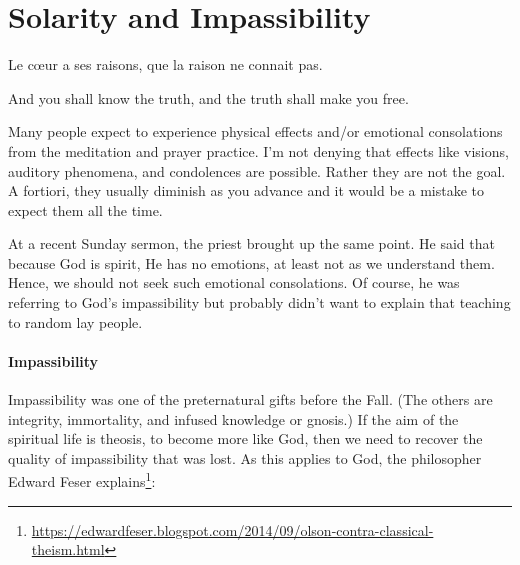 \section{Solarity and Impassibility}

\begin{quotex}
Le cœur a ses raisons, que la raison ne connait pas. 

And you shall know the truth, and the truth shall make you free. 

\end{quotex}
Many people expect to experience physical effects and/or emotional consolations from the meditation and prayer practice. I'm not denying that effects like visions, auditory phenomena, and condolences are possible. Rather they are not the goal. A fortiori, they usually diminish as you advance and it would be a mistake to expect them all the time.

At a recent Sunday sermon, the priest brought up the same point. He said that because God is spirit, He has no emotions, at least not as we understand them. Hence, we should not seek such emotional consolations. Of course, he was referring to God's impassibility but probably didn't want to explain that teaching to random lay people.

\paragraph{Impassibility}
Impassibility was one of the preternatural gifts before the Fall. (The others are integrity, immortality, and infused knowledge or gnosis.) If the aim of the spiritual life is theosis, to become more like God, then we need to recover the quality of impassibility that was lost. As this applies to God, the philosopher Edward Feser explains\footnote{\url{https://edwardfeser.blogspot.com/2014/09/olson-contra-classical-theism.html}}: 

